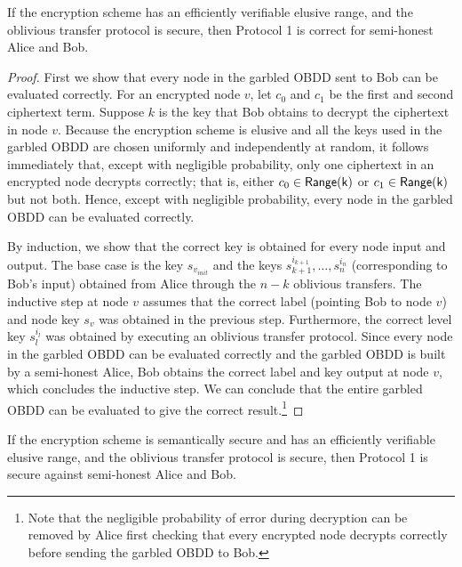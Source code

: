 \begin{claim} If the encryption scheme has 
an efficiently verifiable elusive range, and the
oblivious transfer protocol is secure, then Protocol 1 is correct for
semi-honest Alice and Bob.
\label{claim:protocol1correct}
\end{claim}
\begin{proof}
First we show that every node in the garbled OBDD sent to Bob can be
evaluated correctly. For an encrypted node $v$, let $c_0$ and $c_1$ be
the first and second ciphertext term. Suppose $k$ is the key that Bob
obtains to decrypt the ciphertext in node $v$. Because the
encryption scheme is elusive and all the keys used in the garbled OBDD
are chosen uniformly and independently at random, it follows
immediately that, except with negligible probability, only one
ciphertext in an encrypted node decrypts correctly; that is,
either $c_0\in\mathsf{Range(k)}$ or $c_1\in\mathsf{Range(k)}$ but not
both. Hence, except with negligible probability, every node in the
garbled OBDD can be evaluated correctly.

By induction, we show that the correct key is obtained for every node
input and output. The base case is the key $s_{v_{init}}$ and the 
keys $s^{i_{k+1}}_{k+1},\ldots,s^{i_{n}}_{n}$ (corresponding to Bob's
input) obtained from Alice through the $n-k$ oblivious transfers. The
inductive step at node $v$ assumes that the correct label (pointing
Bob to node $v$) and node key $s_v$ was obtained in the previous
step. Furthermore, the correct level key $s_l^{i_l}$ was obtained by
executing an oblivious transfer protocol. Since every node in the
garbled OBDD can be evaluated correctly and the garbled OBDD is built by
a semi-honest Alice, Bob obtains the correct label and key output at
node $v$, which concludes the inductive step. We can conclude that the
entire garbled OBDD can be evaluated to give the correct result.\footnote{
Note that the negligible probability of error during
decryption can be removed by Alice first checking that every encrypted
node decrypts correctly before sending the garbled OBDD to Bob.
}
\end{proof}



\begin{claim} If the encryption scheme is semantically secure and has an
efficiently verifiable elusive range, and the oblivious transfer
protocol is secure, then Protocol 1 is secure against semi-honest
Alice and Bob.
\label{claim:protocol1secure}
\end{claim}



